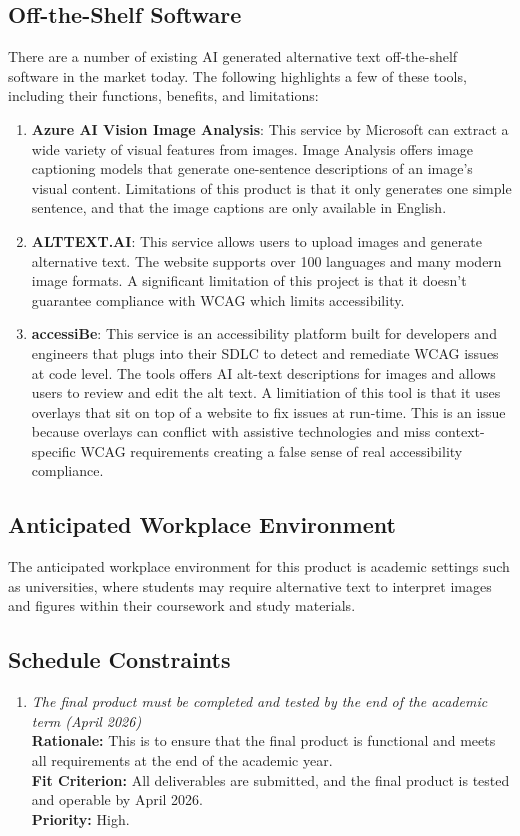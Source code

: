 \documentclass[12pt]{article}
\begin{document}
\subsection{Off-the-Shelf Software}
There are a number of existing AI generated alternative text off-the-shelf software in the market today. The following 
highlights a few of these tools, including their functions, benefits, and limitations: 
\begin{enumerate}
  \item \textbf{Azure AI Vision Image Analysis}: This service by Microsoft can extract a wide variety of 
  visual features from images. Image Analysis offers image captioning models that generate one-sentence descriptions of an image's visual content.
  Limitations of this product is that it only generates one simple sentence, and that the image
  captions are only available in English.
  \item \textbf{ALTTEXT.AI}: This service allows users to upload images and generate alternative text. The website supports
  over 100 languages and many modern image formats. A significant limitation of this project
  is that it doesn't guarantee compliance with WCAG which limits accessibility.
  \item \textbf{accessiBe}: This service is an accessibility platform built for developers and engineers that plugs into their SDLC to detect and 
  remediate WCAG issues at code level. The tools offers AI alt-text descriptions for images and allows users to review 
  and edit the alt text. A limitiation of this tool is that it uses overlays that sit on top of a website to fix issues at run-time. This is an issue 
  because overlays can conflict with assistive technologies and miss context-specific WCAG requirements creating a false sense of real accessibility compliance.
\end{enumerate}
\subsection{Anticipated Workplace Environment}
The anticipated workplace environment for this product is academic settings such as universities, where students may 
require alternative text to interpret images and figures within their coursework and study materials. 
\subsection{Schedule Constraints}
\begin{enumerate}[label=MD-SC \arabic*., wide=0pt, leftmargin=*]
  \item \emph{The final product must be completed and tested by the end of the academic term (April 2026)}\\[2mm]
    {\bf Rationale:} This is to ensure that the final product is functional and meets all requirements
    at the end of the academic year.\\
    {\bf Fit Criterion:} All deliverables are submitted, and the final product is tested and operable by April 2026. \\
    {\bf Priority:} High.
\end{enumerate}
\end{document}
